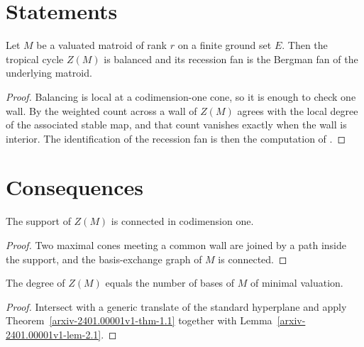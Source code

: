 
\section{Statements}\label{arxiv-2401.00001v1-sec-1}

\begin{theorem}\label{arxiv-2401.00001v1-thm-1.1}
\label{arxiv-2401.00001v1-thm:main}
Let $M$ be a valuated matroid of rank $r$ on a finite ground set $E$. Then the tropical cycle $Z(M)$ is balanced and its recession fan is the Bergman fan of the underlying matroid.
\end{theorem}

\begin{proof}
Balancing is local at a codimension-one cone, so it is enough to check one wall. By \cite[Theorem 1.1]{other} the weighted count across a wall of $Z(M)$ agrees with the local degree of the associated stable map, and that count vanishes exactly when the wall is interior. The identification of the recession fan is then the computation of \cite{third}.
\end{proof}

\section{Consequences}\label{arxiv-2401.00001v1-sec-2}

\begin{lemma}\label{arxiv-2401.00001v1-lem-2.1}
\label{arxiv-2401.00001v1-lem:support}
The support of $Z(M)$ is connected in codimension one.
\end{lemma}

\begin{proof}
Two maximal cones meeting a common wall are joined by a path inside the support, and the basis-exchange graph of $M$ is connected.
\end{proof}

\begin{proposition}\label{arxiv-2401.00001v1-prop-2.2}
\label{arxiv-2401.00001v1-prop:degree}
The degree of $Z(M)$ equals the number of bases of $M$ of minimal valuation.
\end{proposition}

\begin{proof}
Intersect with a generic translate of the standard hyperplane and apply Theorem~\ref{arxiv-2401.00001v1-thm-1.1} together with Lemma~\ref{arxiv-2401.00001v1-lem-2.1}.
\end{proof}
